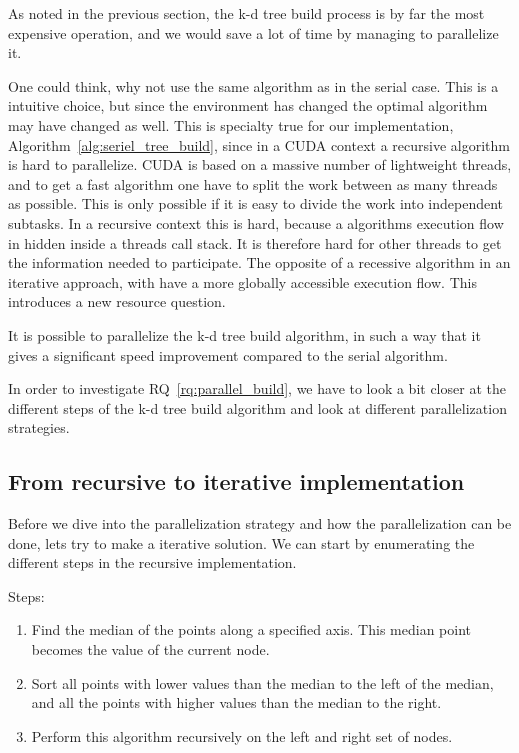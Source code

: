 
As noted in the previous section, the k-d tree build process is by far the most expensive operation, and we would save a lot of time by managing to parallelize it.

One could think, why not use the same algorithm as in the serial case. This is a intuitive choice, but since the environment has changed the optimal algorithm may have changed as well. This is specialty true for our implementation, Algorithm~\ref{alg:seriel_tree_build}, since in a CUDA context a recursive algorithm is hard to parallelize. CUDA is based on a massive number of lightweight threads, and to get a fast algorithm one have to split the work between as many threads as possible. This is only possible if it is easy to divide the work into independent subtasks. In a recursive context this is hard, because a algorithms execution flow in hidden inside a threads call stack. It is therefore hard for other threads to get the information needed to participate. The opposite of a recessive algorithm in an iterative approach, with have a more globally accessible execution flow. This introduces a new resource question.

\begin{myrq}
\label{rq:parallel_build}
    It is possible to parallelize the k-d tree build algorithm, in such a way that it gives a significant speed improvement compared to the serial algorithm.
\end{myrq}

In order to investigate RQ~\ref{rq:parallel_build}, we have to look a bit closer at the different steps of the k-d tree build algorithm and look at different parallelization strategies.


\subsection{From recursive to iterative implementation} %
\label{ssub:from_recursive_to_iterative_implementation}


Before we dive into the parallelization strategy and how the parallelization can be done, lets try to make a iterative solution. We can start by enumerating the different steps in the recursive implementation.

Steps:
\begin{enumerate}
    \item Find the median of the points along a specified axis. This median point becomes the value of the current node.
    \item Sort all points with lower values than the median to the left of the median, and all the points with higher values than the median to the right.
    \item Perform this algorithm recursively on the left and right set of nodes.
\end{enumerate}

